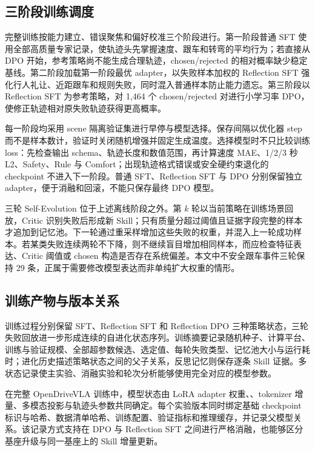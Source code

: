 \documentclass[UTF8,a4paper,12pt,fontset=fandol]{ctexart}
\begin{document}
\subsection{三阶段训练调度}
完整训练按能力建立、错误聚焦和偏好校准三个阶段进行。第一阶段普通 SFT 使用全部高质量专家记录，使轨迹头先掌握速度、跟车和转弯的平均行为；若直接从 DPO 开始，参考策略尚不能生成合理轨迹，chosen/rejected 的相对概率缺少稳定基线。第二阶段加载第一阶段最优 adapter，以失败样本加权的 Reflection SFT 强化行人礼让、近距跟车和规则失败，同时混入普通样本防止能力遗忘。第三阶段以 Reflection SFT 为参考策略，对 1,464 个 chosen/rejected 对进行小学习率 DPO，使修正轨迹相对原失败轨迹获得更高概率。

每一阶段均采用 scene 隔离验证集进行早停与模型选择。保存间隔以优化器 step 而不是样本数计，验证时关闭随机增强并固定生成温度。选择模型时不只比较训练 loss：先检查输出 schema、轨迹长度和数值范围，再计算速度 MAE、1/2/3 秒 L2、Safety、Rule 与 Comfort；出现轨迹格式错误或安全硬约束退化的 checkpoint 不进入下一阶段。普通 SFT、Reflection SFT 与 DPO 分别保留独立 adapter，便于消融和回滚，不能只保存最终 DPO 模型。

三轮 Self-Evolution 位于上述离线阶段之外。第 $k$ 轮以当前策略在训练场景回放，Critic 识别失败后形成新 Skill；只有质量分超过阈值且证据字段完整的样本才追加到记忆池。下一轮通过重采样增加这些失败的权重，并混入上一轮成功样本。若某类失败连续两轮不下降，则不继续盲目增加相同样本，而应检查特征表达、Critic 阈值或 chosen 构造是否存在系统偏差。本文中不安全跟车事件三轮保持 29 条，正属于需要修改模型表达而非单纯扩大权重的情形。

\subsection{训练产物与版本关系}
训练过程分别保留 SFT、Reflection SFT 和 Reflection DPO 三种策略状态，三轮失败回放进一步形成连续的自进化状态序列。训练摘要记录随机种子、计算平台、训练与验证规模、全部超参数候选、选定值、每轮失败类型、记忆池大小与运行耗时；进化历史描述策略状态之间的父子关系，反思记忆则保存逐条 Skill 证据。多状态记录使主实验、消融实验和轮次分析能够使用完全对应的模型参数。

在完整 OpenDriveVLA 训练中，模型状态由 LoRA adapter 权重、、tokenizer 增量、多模态投影与轨迹头参数共同确定。每个实验版本同时绑定基础 checkpoint 标识与哈希、数据清单哈希、训练配置、验证指标和推理缓存，并记录父模型关系。该记录方式支持在 DPO 与 Reflection SFT 之间进行严格消融，也能够区分基座升级与同一基座上的 Skill 增量更新。
\end{document}
